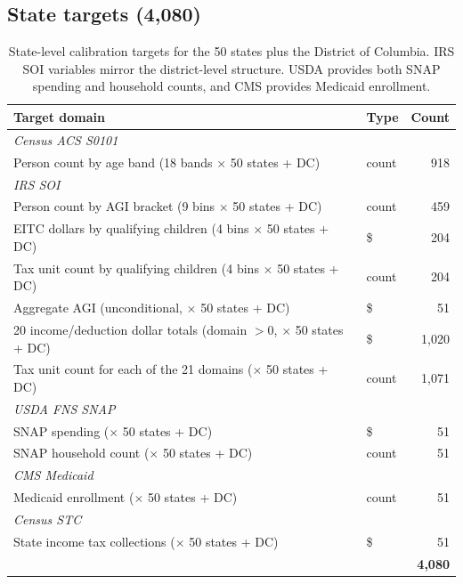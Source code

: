 \subsection{State targets (4,080)}

\begin{table}[H]
\centering
{\tablefont
\begin{tabular}{p{}lr}
\toprule
Target domain & Type & Count \\
\midrule
\multicolumn{3}{l}{\textit{Census ACS S0101}} \\
Person count by age band (18 bands $\times$ 50 states + DC) & count & 918 \\
\midrule
\multicolumn{3}{l}{\textit{IRS SOI}} \\
Person count by AGI bracket (9 bins $\times$ 50 states + DC) & count & 459 \\
EITC dollars by qualifying children (4 bins $\times$ 50 states + DC) & \$ & 204 \\
Tax unit count by qualifying children (4 bins $\times$ 50 states + DC) & count & 204 \\
Aggregate AGI (unconditional, $\times$ 50 states + DC) & \$ & 51 \\
20 income/deduction dollar totals (domain $> 0$, $\times$ 50 states + DC) & \$ & 1{,}020 \\
Tax unit count for each of the 21 domains ($\times$ 50 states + DC) & count & 1{,}071 \\
\midrule
\multicolumn{3}{l}{\textit{USDA FNS SNAP}} \\
SNAP spending ($\times$ 50 states + DC) & \$ & 51 \\
SNAP household count ($\times$ 50 states + DC) & count & 51 \\
\midrule
\multicolumn{3}{l}{\textit{CMS Medicaid}} \\
Medicaid enrollment ($\times$ 50 states + DC) & count & 51 \\
\midrule
\multicolumn{3}{l}{\textit{Census STC}} \\
State income tax collections ($\times$ 50 states + DC) & \$ & 51 \\
\midrule
& & \textbf{4{,}080} \\
\bottomrule
\end{tabular}
}
\caption{State-level calibration targets for the 50 states plus the District of Columbia. IRS SOI
variables mirror the district-level structure. USDA provides both SNAP spending and household
counts, and CMS provides Medicaid enrollment.}
\label{tab:state_targets}
\end{table}

